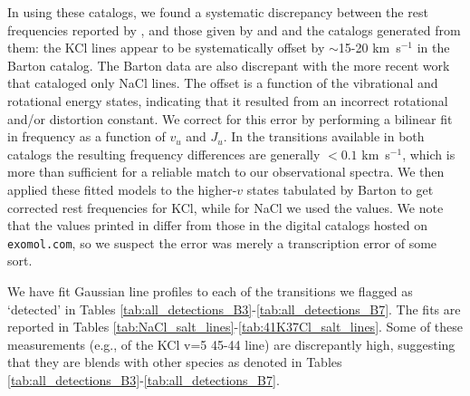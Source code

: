 \documentclass[12pt]{article}
\newcommand{\kms}{\textrm{km~s}\ensuremath{^{-1}}\xspace}	%
\begin{document}
In using these catalogs, we found a systematic discrepancy between the rest
frequencies reported by \cite{Barton2014a}, and those given by
\cite{Caris2004a} and \cite{Caris2002a} and the catalogs generated from them:
the KCl lines appear to be systematically offset by $\sim$15-20 \kms in the
Barton catalog.  The Barton data are also discrepant with the more recent
\cite{Cabezas2016a} work that cataloged only NaCl lines. The offset is a
function of the vibrational and rotational energy states, indicating that it
resulted from an incorrect rotational and/or distortion constant.  We correct
for this error by performing a bilinear fit in frequency as a function of $v_u$
and $J_u$.  In the transitions available in both catalogs the resulting
frequency differences are generally $<0.1$ \kms, which is more than sufficient
for a reliable match to our observational spectra.  We then applied these
fitted models to the higher-$v$ states tabulated by Barton to get corrected
rest frequencies for KCl, while for NaCl we used the \cite{Cabezas2016a}
values.  We note that the values printed in \cite{Barton2014a} differ from
those in the digital catalogs hosted on \texttt{exomol.com}, so we suspect the
error was merely a transcription error of some sort.







We have fit Gaussian line profiles to each of the transitions we flagged as
`detected' in Tables \ref{tab:all_detections_B3}-\ref{tab:all_detections_B7}.
The fits are reported in Tables
\ref{tab:NaCl_salt_lines}-\ref{tab:41K37Cl_salt_lines}.  Some of these
measurements (e.g., of the KCl v=5 45-44 line) are discrepantly
high, suggesting that they are blends with other species as denoted in 
Tables \ref{tab:all_detections_B3}-\ref{tab:all_detections_B7}.
\end{document}
